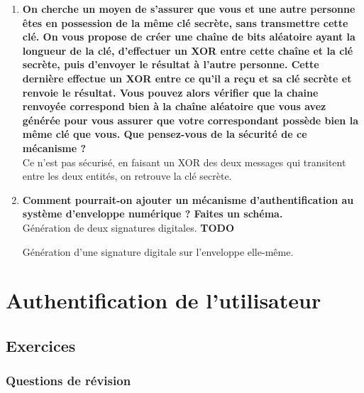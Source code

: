 \documentclass{report}
\begin{document}
			\begin{enumerate}
				\item \textbf{On cherche un moyen de s’assurer que vous et une autre personne êtes en possession de la même clé secrète, sans transmettre cette clé. On vous propose de créer une chaîne de bits aléatoire ayant la longueur de la clé, d’effectuer un XOR entre cette chaîne et la clé secrète, puis d’envoyer le résultat à l’autre personne. Cette dernière effectue un XOR entre ce qu’il a reçu et sa clé secrète et renvoie le résultat. Vous pouvez alors vérifier que la chaine renvoyée correspond bien à la chaîne aléatoire que vous avez générée pour vous assurer que votre correspondant possède bien la même clé que vous. Que pensez-vous de la sécurité de ce mécanisme ?}\\

					Ce n'est pas sécurisé, en faisant un XOR des deux messages qui transitent entre les deux entités, on retrouve la clé secrète.\\

				\item \textbf{Comment pourrait-on ajouter un mécanisme d’authentification au système d’enveloppe numérique ? Faites un schéma.}\\

					Génération de deux signatures digitales. \textbf{TODO}

					Génération d'une signature digitale sur l'enveloppe elle-même.


			\end{enumerate}

\chapter{Authentification de l'utilisateur}
	
	\section{Exercices}

		\subsection{Questions de révision}
\end{document}
